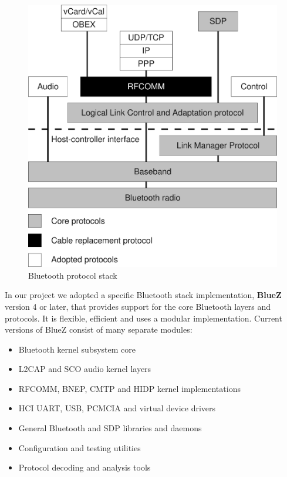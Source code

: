 \documentclass[conference]{IEEEtran}
\begin{document}
\begin{figure}[h]
\centering
\includegraphics[scale=0.4]{BTstack}
\caption{Bluetooth protocol stack}
\label{stack}
\end{figure}

In our project we adopted a specific Bluetooth stack implementation, \textbf{BlueZ} version 4 or later, that provides support for the core Bluetooth layers and protocols. It is flexible, efficient and uses a modular implementation. Current versions of BlueZ consist of many separate modules:
\begin{itemize}
\item Bluetooth kernel subsystem core
\item L2CAP and SCO audio kernel layers
\item RFCOMM, BNEP, CMTP and HIDP kernel implementations
\item HCI UART, USB, PCMCIA and virtual device drivers
\item General Bluetooth and SDP libraries and daemons
\item Configuration and testing utilities
\item Protocol decoding and analysis tools
\end{itemize}
\end{document}
